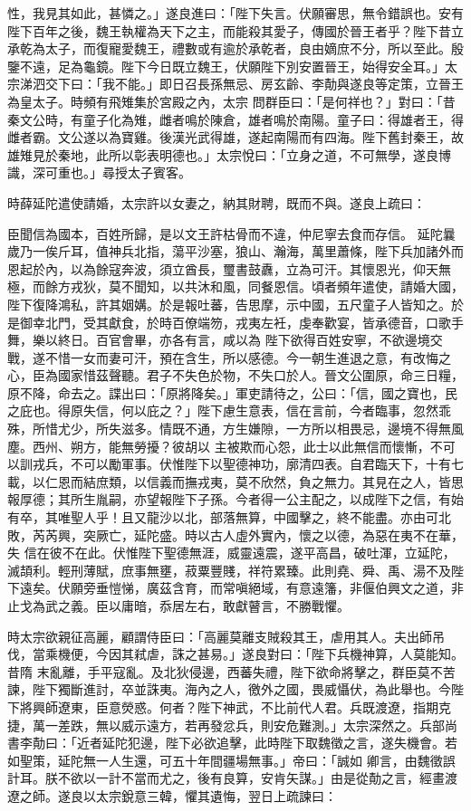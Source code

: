 \begin{pinyinscope}
 性，我見其如此，甚憐之。」遂良進曰：「陛下失言。伏願審思，無令錯誤也。安有陛下百年之後，魏王執權為天下之主，而能殺其愛子，傳國於晉王者乎？陛下昔立承乾為太子，而復寵愛魏王，禮數或有逾於承乾者，良由嫡庶不分，所以至此。殷鑒不遠，足為龜鏡。陛下今日既立魏王，伏願陛下別安置晉王，始得安全耳。」太宗涕泗交下曰：「我不能。」即日召長孫無忌、房玄齡、李勣與遂良等定策，立晉王為皇太子。時頻有飛雉集於宮殿之內，太宗
 問群臣曰：「是何祥也？」對曰：「昔秦文公時，有童子化為雉，雌者鳴於陳倉，雄者鳴於南陽。童子曰：得雄者王，得雌者霸。文公遂以為寶雞。後漢光武得雄，遂起南陽而有四海。陛下舊封秦王，故雄雉見於秦地，此所以彰表明德也。」太宗悅曰：「立身之道，不可無學，遂良博識，深可重也。」尋授太子賓客。



 時薛延陀遣使請婚，太宗許以女妻之，納其財聘，既而不與。遂良上疏曰：



 臣聞信為國本，百姓所歸，是以文王許枯骨而不違，仲尼寧去食而存信。
 延陀曩歲乃一俟斤耳，值神兵北指，蕩平沙塞，狼山、瀚海，萬里蕭條，陛下兵加諸外而恩起於內，以為餘寇奔波，須立酋長，璽書鼓纛，立為可汗。其懷恩光，仰天無極，而餘方戎狄，莫不聞知，以共沐和風，同餐恩信。頃者頻年遣使，請婚大國，陛下復降鴻私，許其姻媾。於是報吐蕃，告思摩，示中國，五尺童子人皆知之。於是御幸北門，受其獻食，於時百僚端笏，戎夷左衽，虔奉歡宴，皆承德音，口歌手舞，樂以終日。百官會畢，亦各有言，咸以為
 陛下欲得百姓安寧，不欲邊境交戰，遂不惜一女而妻可汗，預在含生，所以感德。今一朝生進退之意，有改悔之心，臣為國家惜茲聲聽。君子不失色於物，不失口於人。晉文公圍原，命三日糧，原不降，命去之。諜出曰：「原將降矣。」軍吏請待之，公曰：「信，國之寶也，民之庇也。得原失信，何以庇之？」陛下慮生意表，信在言前，今者臨事，忽然乖殊，所惜尤少，所失滋多。情既不通，方生嫌隙，一方所以相畏忌，邊境不得無風塵。西州、朔方，能無勞擾？彼胡以
 主被欺而心怨，此士以此無信而懷慚，不可以訓戎兵，不可以勵軍事。伏惟陛下以聖德神功，廓清四表。自君臨天下，十有七載，以仁恩而結庶類，以信義而撫戎夷，莫不欣然，負之無力。其見在之人，皆思報厚德；其所生胤嗣，亦望報陛下子孫。今者得一公主配之，以成陛下之信，有始有卒，其唯聖人乎！且又龍沙以北，部落無算，中國擊之，終不能盡。亦由可北敗，芮芮興，突厥亡，延陀盛。時以古人虛外實內，懷之以德，為惡在夷不在華，失
 信在彼不在此。伏惟陛下聖德無涯，威靈遠震，遂平高昌，破吐渾，立延陀，滅頡利。輕刑薄賦，庶事無壅，菽粟豐賤，祥符累臻。此則堯、舜、禹、湯不及陛下遠矣。伏願旁垂愷悌，廣茲含育，而常嗔絕域，有意遠籓，非偃伯興文之道，非止戈為武之義。臣以庸暗，忝居左右，敢獻瞽言，不勝戰懼。



 時太宗欲親征高麗，顧謂侍臣曰：「高麗莫離支賊殺其王，虐用其人。夫出師吊伐，當乘機便，今因其弒虐，誅之甚易。」遂良對曰：「陛下兵機神算，人莫能知。昔隋
 末亂離，手平寇亂。及北狄侵邊，西蕃失禮，陛下欲命將擊之，群臣莫不苦諫，陛下獨斷進討，卒並誅夷。海內之人，徼外之國，畏威懾伏，為此舉也。今陛下將興師遼東，臣意熒惑。何者？陛下神武，不比前代人君。兵既渡遼，指期克捷，萬一差跌，無以威示遠方，若再發忿兵，則安危難測。」太宗深然之。兵部尚書李勣曰：「近者延陀犯邊，陛下必欲追擊，此時陛下取魏徵之言，遂失機會。若如聖策，延陀無一人生還，可五十年間疆場無事。」帝曰：「誠如
 卿言，由魏徵誤計耳。朕不欲以一計不當而尤之，後有良算，安肯矢謀。」由是從勣之言，經畫渡遼之師。遂良以太宗銳意三韓，懼其遺悔，翌日上疏諫曰：




\end{pinyinscope}
